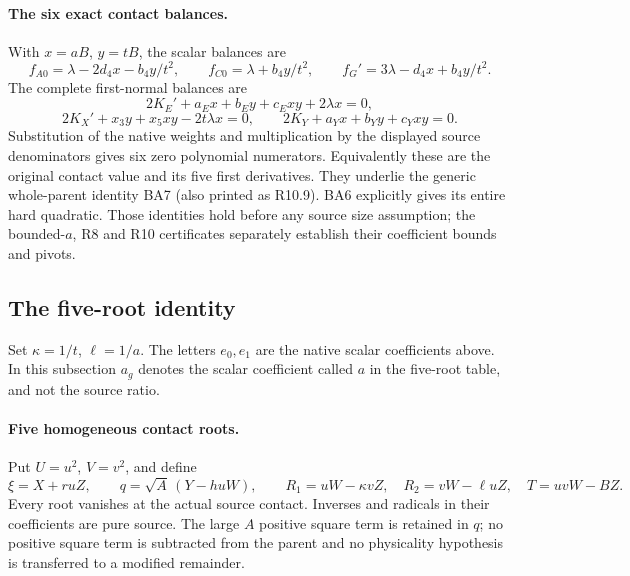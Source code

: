 \paragraph{The six exact contact balances.}
With $x=aB$, $y=tB$, the scalar balances are
\[
 f_{A0}=\lambda-2d_4x-b_4y/t^2,\qquad
 f_{C0}=\lambda+b_4y/t^2,\qquad
 f_G'=3\lambda-d_4x+b_4y/t^2.\tag{RC1}
\]
The complete first-normal balances are
\[
 2K_E'+a_Ex+b_Ey+c_Exy+2\lambda x=0,
\]
\[
 2K_X'+x_3y+x_5xy-2t\lambda x=0,\qquad
 2K_Y+a_Yx+b_Yy+c_Yxy=0.\tag{RC6}
\]
Substitution of the native weights and multiplication by the displayed
source denominators gives six zero polynomial numerators. Equivalently
these are the original contact value and its five first derivatives.
They underlie the generic whole-parent identity BA7 (also printed as
R10.9). BA6 explicitly gives its entire hard quadratic. Those identities
hold before any source size assumption; the bounded-$a$, R8 and R10
certificates separately establish their coefficient bounds and pivots.

\subsection{The five-root identity}
\label{component:p9ec3d6bbd717}
Set $\kappa=1/t$, $\ell=1/a$. The letters $e_0,e_1$ are the native
scalar coefficients above. In this subsection $a_g$ denotes the scalar
coefficient called $a$ in the five-root table, and not the source ratio.
\paragraph{Five homogeneous contact roots.}
Put $U=u^2$, $V=v^2$, and define
\[
 \xi=X+ruZ,\qquad q=\sqrt A\,(Y-huW),\qquad
 R_1=uW-\kappa vZ,\quad R_2=vW-\ell uZ,\quad
 T=uvW-BZ.                                             \tag{WA3}
\]
Every root vanishes at the actual source contact. Inverses and
radicals in their coefficients are pure source. The large $A$
positive square term is retained in $q$; no positive square term is subtracted from
the parent and no physicality hypothesis is transferred to a
modified remainder.

